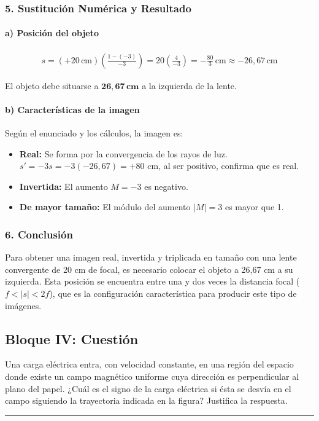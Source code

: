 \subsubsection*{5. Sustitución Numérica y Resultado}
\paragraph*{a) Posición del objeto}
\begin{gather}
    s = (+20\,\text{cm}) \left(\frac{1 - (-3)}{-3}\right) = 20 \left(\frac{4}{-3}\right) = -\frac{80}{3}\,\text{cm} \approx -26,67\,\text{cm}
\end{gather}
\begin{cajaresultado}
El objeto debe situarse a $\boldsymbol{26,67\,\textbf{cm}}$ a la izquierda de la lente.
\end{cajaresultado}

\paragraph*{b) Características de la imagen}
Según el enunciado y los cálculos, la imagen es:
\begin{itemize}
    \item \textbf{Real:} Se forma por la convergencia de los rayos de luz. $s' = -3s = -3(-26,67) = +80$ cm, al ser positivo, confirma que es real.
    \item \textbf{Invertida:} El aumento $M=-3$ es negativo.
    \item \textbf{De mayor tamaño:} El módulo del aumento $|M|=3$ es mayor que 1.
\end{itemize}

\subsubsection*{6. Conclusión}
\begin{cajaconclusion}
Para obtener una imagen real, invertida y triplicada en tamaño con una lente convergente de 20 cm de focal, es necesario colocar el objeto a 26,67 cm a su izquierda. Esta posición se encuentra entre una y dos veces la distancia focal ($f < |s| < 2f$), que es la configuración característica para producir este tipo de imágenes.
\end{cajaconclusion}

\newpage

\subsection{Bloque IV: Cuestión}
\label{subsec:B4_2012_jun_ord}
\begin{cajaenunciado}
Una carga eléctrica entra, con velocidad constante, en una región del espacio donde existe un campo magnético uniforme cuya dirección es perpendicular al plano del papel. ¿Cuál es el signo de la carga eléctrica si ésta se desvía en el campo siguiendo la trayectoria indicada en la figura? Justifica la respuesta.
\end{cajaenunciado}
\hrule

